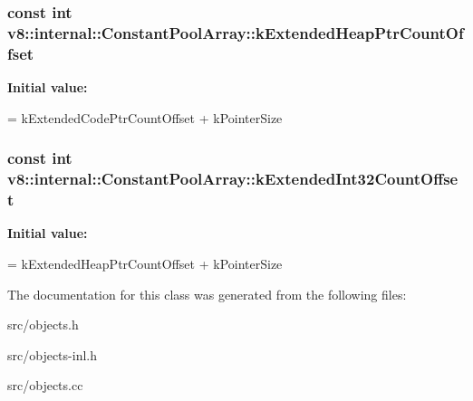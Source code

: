 \subsubsection[{k\+Extended\+Heap\+Ptr\+Count\+Offset}]{\setlength{\rightskip}{0pt plus 5cm}const int v8\+::internal\+::\+Constant\+Pool\+Array\+::k\+Extended\+Heap\+Ptr\+Count\+Offset\hspace{0.3cm}{\ttfamily [static]}}\label{classv8_1_1internal_1_1_constant_pool_array_af84df1f1925a7338ff51f4468c04d276}
{\bfseries Initial value\+:}
\begin{DoxyCode}
=
      kExtendedCodePtrCountOffset + kPointerSize
\end{DoxyCode}
\hypertarget{classv8_1_1internal_1_1_constant_pool_array_a68ff9c9a7c9bf48cae22f40e6c9f22ed}{}
\subsubsection[{k\+Extended\+Int32\+Count\+Offset}]{\setlength{\rightskip}{0pt plus 5cm}const int v8\+::internal\+::\+Constant\+Pool\+Array\+::k\+Extended\+Int32\+Count\+Offset\hspace{0.3cm}{\ttfamily [static]}}\label{classv8_1_1internal_1_1_constant_pool_array_a68ff9c9a7c9bf48cae22f40e6c9f22ed}
{\bfseries Initial value\+:}
\begin{DoxyCode}
=
      kExtendedHeapPtrCountOffset + kPointerSize
\end{DoxyCode}


The documentation for this class was generated from the following files\+:\begin{DoxyCompactItemize}
\item 
src/objects.\+h\item 
src/objects-\/inl.\+h\item 
src/objects.\+cc\end{DoxyCompactItemize}

